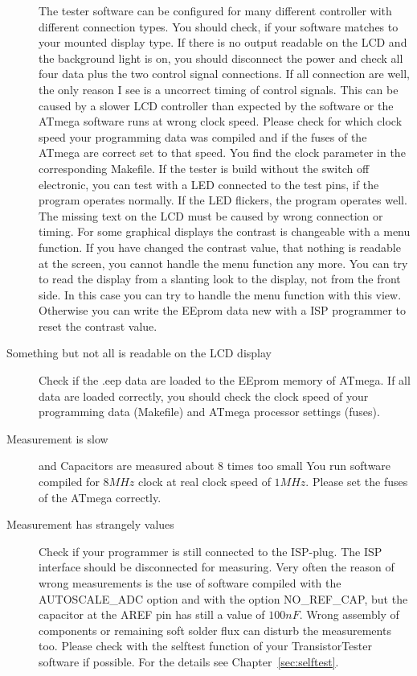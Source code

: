 \begin{description}
The tester software can be configured for many different controller with different connection
types. You should check, if your software matches to your mounted display type.
If there is no output readable on the LCD and the background light is on,
you should disconnect the power and check all four data plus the two control signal connections.
If all connection are well, the only reason I see is a uncorrect timing of
control signals. This can be caused by a slower LCD controller than expected by
the software or the ATmega software runs at wrong clock speed. Please check for which
clock speed your programming data was compiled  and if the fuses of the
ATmega are correct set to that speed. You find the clock parameter in the corresponding
Makefile.
If the tester is build without the switch off electronic, you can test with
a LED connected to the test pins, if the program operates normally.
If the LED flickers, the program operates well. The missing text on the
LCD must be caused by wrong connection or timing.
For some graphical displays the contrast is changeable with a menu function.
If you have changed the contrast value, that nothing is readable at the screen,
you cannot handle the menu function any more. You can try to read the display
from a slanting look to the display, not from the front side.
In this case you can try to handle the menu function with this view.
Otherwise you can write the EEprom data new with a ISP programmer to reset the contrast value.


\item[Something but not all is readable on the LCD display]
Check if the .eep data are loaded to the EEprom memory of ATmega.
If all data are loaded correctly, you should check the clock speed of your
programming data (Makefile) and ATmega processor settings (fuses).

\item[Measurement is slow] and Capacitors are measured about 8 times too small
You run software compiled for \(8MHz\) clock at real clock speed of \(1MHz\).
Please set the fuses of the ATmega correctly.

\item[Measurement has strangely values]
Check if your programmer is still connected to the ISP-plug.
The ISP interface should be disconnected for measuring.
Very often the reason of wrong measurements is the use of software compiled with
the AUTOSCALE\_ADC option and with the option NO\_REF\_CAP, but the capacitor
at the AREF pin has still a value of \(100nF\).
Wrong assembly of components or remaining soft solder flux can disturb the 
measurements too. Please check with the selftest function of your TransistorTester software
if possible. For the details see Chapter~\ref{sec:selftest}.


\end{description}
